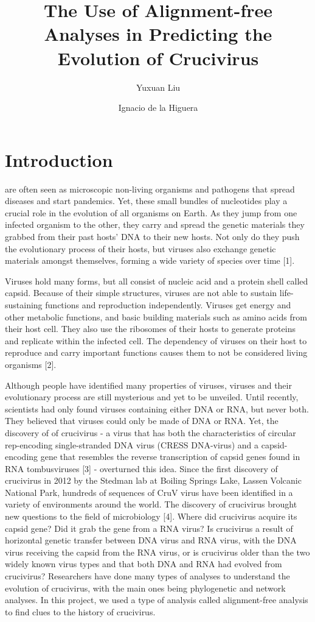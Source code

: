 \documentclass[eng]{ajceam-class}
\title{The Use of Alignment-free Analyses in Predicting the Evolution of Crucivirus}
\author[1]{Yuxuan Liu}
\author[2]{Ignacio de la Higuera}
\affil[1]{Institute for Computing in Research}
\begin{document}
\maketitle
\thispagestyle{fancy}
\printcontactdata

\section{Introduction}
are often seen as microscopic non-living organisms and pathogens that spread diseases and start pandemics. Yet, these small bundles of nucleotides play a crucial role in the evolution of all organisms on Earth. As they jump from one infected organism to the other, they carry and spread the genetic materials they grabbed from their past hosts’ DNA to their new hosts. Not only do they push the evolutionary process of their hosts, but viruses also exchange genetic materials amongst themselves, forming a wide variety of species over time [1]. 

Viruses hold many forms, but all consist of nucleic acid and a protein shell called capsid. Because of their simple structures, viruses are not able to sustain life-sustaining functions and reproduction independently. Viruses get energy and other metabolic functions, and basic building materials such as amino acids from their host cell. They also use the ribosomes of their hosts to generate proteins and replicate within the infected cell. The dependency of viruses on their host to reproduce and carry important functions causes them to not be considered living organisms [2].

Although people have identified many properties of viruses, viruses and their evolutionary process are still mysterious and yet to be unveiled. Until recently, scientists had only found viruses containing either DNA or RNA, but never both. They believed that viruses could only be made of DNA or RNA. Yet, the discovery of of crucivirus - a virus that has both the characteristics of circular rep-encoding single-stranded DNA virus (CRESS DNA-virus) and a capsid-encoding gene that resembles the reverse transcription of capsid genes found in RNA tombusviruses [3] - overturned this idea. Since the first discovery of crucivirus in 2012 by the Stedman lab at Boiling Springs Lake, Lassen Volcanic National Park, hundreds of sequences of CruV virus have been identified in a variety of environments around the world. The discovery of crucivirus brought new questions to the field of microbiology [4]. Where did crucivirus acquire its capsid gene? Did it grab the gene from a RNA virus? Is crucivirus a result of horizontal genetic transfer between DNA virus and RNA virus, with the DNA virus receiving the capsid from the RNA virus, or is crucivirus older than the two widely known virus types and that both DNA and RNA had evolved from crucivirus? Researchers have done many types of analyses to understand the evolution of crucivirus, with the main ones being phylogenetic and network analyses. In this project, we used a type of analysis called alignment-free analysis to find clues to the history of crucivirus. 
\end{document}
